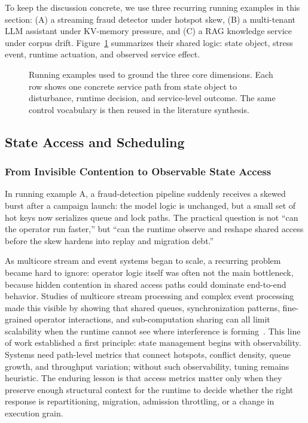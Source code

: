 \documentclass[acmsmall,screen,review]{acmart}
\begin{document}
To keep the discussion concrete, we use three recurring running examples in this section: (A) a streaming fraud detector under hotspot skew, (B) a multi-tenant LLM assistant under KV-memory pressure, and (C) a RAG knowledge service under corpus drift. Figure~\ref{fig:running-examples} summarizes their shared logic: state object, stress event, runtime actuation, and observed service effect.

\begin{figure}[t]
\centering
\resizebox{0.98\textwidth}{!}{}
\caption{Running examples used to ground the three core dimensions. Each row shows one concrete service path from state object to disturbance, runtime decision, and service-level outcome. The same control vocabulary is then reused in the literature synthesis.}
\label{fig:running-examples}
\end{figure}

\subsection{State Access and Scheduling}

\subsubsection{From Invisible Contention to Observable State Access}

In running example A, a fraud-detection pipeline suddenly receives a skewed burst after a campaign launch: the model logic is unchanged, but a small set of hot keys now serializes queue and lock paths. The practical question is not ``can the operator run faster,'' but ``can the runtime observe and reshape shared access before the skew hardens into replay and migration debt.''

As multicore stream and event systems began to scale, a recurring problem became hard to ignore: operator logic itself was often not the main bottleneck, because hidden contention in shared access paths could dominate end-to-end behavior. Studies of multicore stream processing and complex event processing made this visible by showing that shared queues, synchronization patterns, fine-grained operator interactions, and sub-computation sharing can all limit scalability when the runtime cannot see where interference is forming~\cite{zhang2017revisiting,zhang2017mqo}. This line of work established a first principle: state management begins with observability. Systems need path-level metrics that connect hotspots, conflict density, queue growth, and throughput variation; without such observability, tuning remains heuristic. The enduring lesson is that access metrics matter only when they preserve enough structural context for the runtime to decide whether the right response is repartitioning, migration, admission throttling, or a change in execution grain.
\end{document}
